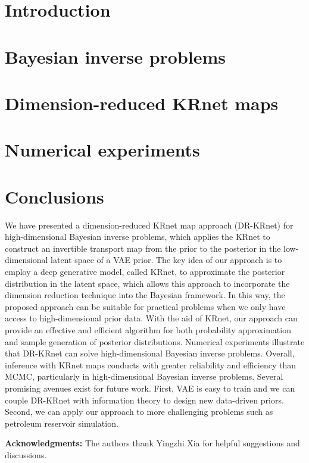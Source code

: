 \documentclass[review,12pt]{elsarticle}
\begin{document}
\section{Introduction}\label{section_intro}

\section{Bayesian inverse problems}\label{section_problem}

\section{Dimension-reduced KRnet maps}\label{section_method}

\section{Numerical experiments}\label{section_experiments}

\section{Conclusions}\label{section_conclude}
We have presented a dimension-reduced KRnet map approach (DR-KRnet) for high-dimensional Bayesian inverse problems, which applies the KRnet to construct an invertible transport map from the prior to the posterior in the low-dimensional latent space of a VAE prior. The key idea of our approach is to employ a deep generative model, called KRnet, to approximate the posterior distribution in the latent space, which allows this approach to incorporate the dimension reduction technique into the Bayesian framework. In this way, the proposed approach can be suitable for practical problems when we only have access to high-dimensional prior data. With the aid of KRnet, our approach can provide an effective and efficient algorithm for both probability approximation and sample generation of posterior distributions. Numerical experiments illustrate that DR-KRnet can solve high-dimensional Bayesian inverse problems. Overall, inference with KRnet maps conducts with greater reliability and efficiency than MCMC, particularly in high-dimensional Bayesian inverse problems. Several promising avenues exist for future work. First, VAE is easy to train and we can couple DR-KRnet with information theory to design new data-driven priors. Second, we can apply our approach to more challenging problems such as petroleum reservoir simulation.


\bigskip
\textbf{Acknowledgments:}
The authors thank Yingzhi Xia for helpful suggestions and
discussions.
\end{document}

